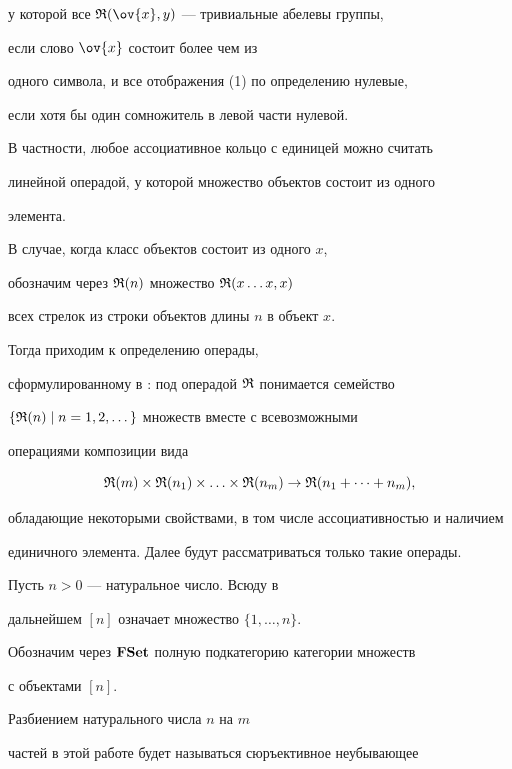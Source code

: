 \begin{exam}
у которой все $\R(\ov{x},y)$ --- тривиальные абелевы группы,


если слово $\ov{x}$ состоит более чем из


одного символа, и все отображения (1) по определению нулевые,


если хотя бы один сомножитель в левой части нулевой.


В частности, любое ассоциативное кольцо с единицей можно считать


линейной операдой, у которой множество объектов состоит из одного


элемента.


В случае, когда класс объектов состоит из одного $x$,


обозначим через ${\frak R}(n)$ множество ${\frak R}(x\dotsc x,x)$


всех стрелок из строки объектов длины $n$ в объект $x$.


Тогда приходим к определению операды,


сформулированному в \cite{May}: под операдой ${\frak R}$ понимается семейство


$\{ {\frak R}(n) \mid n=1,2,\dotsc\}$ множеств вместе с всевозможными


операциями композиции вида


\begin{equation}


\R(m)\times \R(n_1)\times \dotsc \times \R(n_m)


\rightarrow \R(n_1+\dots+ n_m),


\end{equation}


обладающие некоторыми свойствами, в том числе ассоциативностью и наличием


единичного элемента. Далее будут рассматриваться только такие операды.


\end{exam}





Пусть $n>0$ --- натуральное число. Всюду в


дальнейшем $[n]$ означает множество $\{1,\dotsc,n\}$.


Обозначим через ${\bold F}\bold{Set}$ полную подкатегорию категории множеств


с объектами $[n]$.


Разбиением натурального числа $n$ на $m$


частей в этой работе будет называться сюръективное неубывающее


